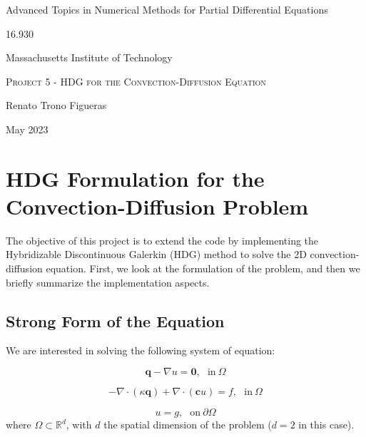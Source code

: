 \documentclass[10pt,a4paper]{article}
\begin{document}
\begin{center}
	Advanced Topics in Numerical Methods for Partial Differential Equations\\
	
	\vspace{5pt}
	
	16.930
	
	\vspace{10pt}
	
	Massachusetts Institute of Technology
	
	\vspace{170pt}
	
	\Large{\textsc{Project 5 - HDG for the Convection-Diffusion Equation}}
	
	\vspace{20pt}
	
	Renato Trono Figueras
	
	\vspace{20pt}
	
	May 2023
\end{center}
\newpage

\section*{HDG Formulation for the Convection-Diffusion Problem}

The objective of this project is to extend the code by implementing the Hybridizable Discontinuous Galerkin (HDG)
method to solve the 2D convection-diffusion equation. First, we look at the formulation of the problem, and then we briefly summarize the implementation aspects.
\subsection*{Strong Form of the Equation}

We are interested in solving the following system of equation:

\begin{equation}
    \mathbf{q} - \nabla u = \mathbf{0},~~~\text{in}~ \Omega 
\end{equation}

\begin{equation}
    -\nabla \cdot (\kappa \mathbf{q}) + \nabla \cdot (\mathbf{c}u) = f,~~~\text{in}~\Omega 
\end{equation}

\begin{equation}
    u = g,~~~\text{on}~\partial \Omega
\end{equation}
where $\Omega \subset \mathbb{R}^d$, with $d$ the spatial dimension of the problem ($d = 2$ in this case).
\end{document}

